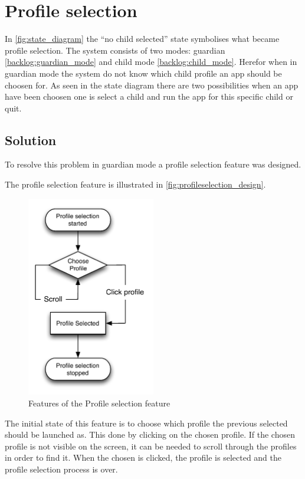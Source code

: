 \section{Profile selection}
\label{design:profile_selection}
In \autoref{fig:state_diagram} the ``no child selected'' state symbolises what became profile selection. The \giraf[] system consists of two modes: guardian \autoref{backlog:guardian_mode} and child mode \autoref{backlog:child_mode}. Herefor when in guardian mode the system do not know which child profile an app should be choosen for. As seen in the state diagram there are two possibilities when an app have been choosen one is select a child and run the app for this specific child or quit.

\subsection{Solution}

To resolve this problem in guardian mode a profile selection feature was designed.

The profile selection feature is illustrated in \autoref{fig:profileselection_design}. 
\label{design:profile_selection}
\begin{figure}[h]
	\centering
	\includegraphics[width=0.5\textwidth]{gfx/profileselect_design.pdf}
	\caption{Features of the Profile selection feature}
	\label{fig:profileselection_design}
\end{figure}
The initial state of this feature is to choose which profile the previous selected should be launched as. This done by clicking on the chosen profile. If the chosen profile is not visible on the screen, it can be needed to scroll through the profiles in order to find it. When the chosen is clicked, the profile is selected and the profile selection process is over.